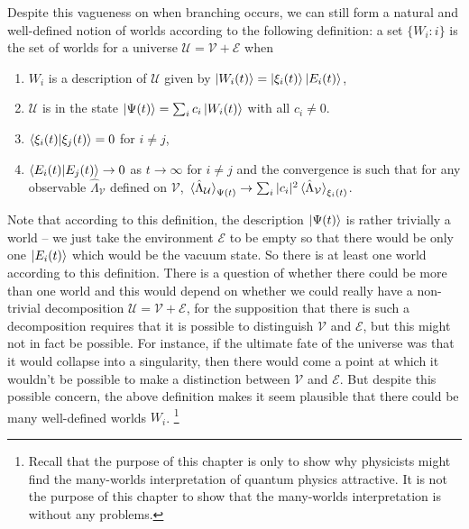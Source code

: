 \documentclass[letter, 12pt]{turabian-thesis}
\theoremstyle{hypothesis}
\let\origfootnote\footnote %
\renewcommand{\footnote}[1]{%
\noindent %
\origfootnote{#1}}
\begin{document}
Despite this vagueness on when branching occurs, we can still form a natural and well-defined notion of worlds according to the following definition: \label{rigorousworld} a set $\{W_i: i\}$ is the set of worlds for a universe $\mathcal{U}=\mathcal{V}+\mathcal{E}$ when 
 \begin{enumerate}[noitemsep, nosep, topsep=0pt]
 \item $W_i$ is a description of $\mathcal{U}$ given by $\ket{W_i(t)}=\ket{\xi_i(t)}\ket{E_i(t)}$,
 \item $\mathcal{U}$ is in the state $\ket{\Psi(t)}=\sum_i c_i \ket{W_i(t)}$ with all $c_i\neq 0$.
 \item $\ip{\xi_i(t)}{\xi_j(t)}=0$ for $i\neq j$,
 \item $\ip{E_i(t)}{E_j(t)}\rightarrow 0$ as $t\rightarrow\infty$ for $i\neq j$ and the convergence is such that for any observable $\hat{\Lambda}_\mathcal{V}$ defined on $\mathcal{V}$, $\ev*{\hat{\Lambda}_\mathcal{U}}_{\Psi(t)}\rightarrow\sum_i |c_i|^2 \ev*{\hat{\Lambda}_\mathcal{V}}_{\xi_i(t)}$. 
 \end{enumerate}
Note that according to this definition, the description $\ket{\Psi(t)}$ is rather trivially a world -- we just take the environment $\mathcal{E}$ to be empty so that there would be only one $\ket{E_i(t)}$ which would be the vacuum state. So there is at least one world according to this definition. There is a question of whether there could be more than one world and this would depend on whether we could really have a non-trivial decomposition $\mathcal{U}=\mathcal{V}+\mathcal{E}$, 
for the supposition that there is such a decomposition requires that it is possible to distinguish $\mathcal{V}$ and $\mathcal{E}$, but this might not in fact be possible. For instance, if the ultimate fate of the universe was that it would collapse into a singularity, then there would come a point at which it wouldn't be possible to make a distinction between $\mathcal{V}$ and $\mathcal{E}$. But despite this possible concern, the above definition makes it seem plausible that there could be many well-defined worlds $W_i$.\footnote{Recall that the purpose of this chapter is only to show why physicists might find the many-worlds interpretation of quantum physics attractive. It is not the purpose of this chapter to show that the many-worlds interpretation is without any problems. }
\end{document}
